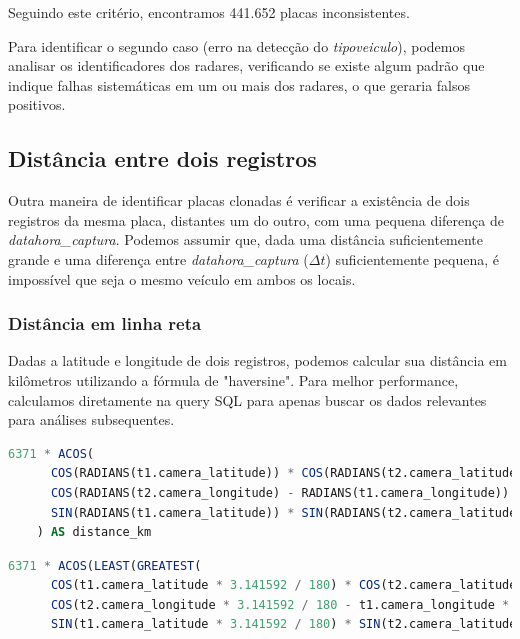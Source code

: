 \documentclass{article}
\begin{document}
Seguindo este critério, encontramos 441.652 placas inconsistentes.

Para identificar o segundo caso (erro na detecção do \textit{tipoveiculo}), podemos analisar os identificadores dos radares, verificando se existe algum padrão que indique falhas sistemáticas em um ou mais dos radares, o que geraria falsos positivos.




\subsection{Distância entre dois registros}

Outra maneira de identificar placas clonadas é verificar a existência de dois registros da mesma placa, distantes um do outro, com uma pequena diferença de \textit{datahora\_captura}. Podemos assumir que, dada uma distância suficientemente grande e uma diferença entre \textit{datahora\_captura} ($\Delta t$) suficientemente pequena, é impossível que seja o mesmo veículo em ambos os locais.

\subsubsection{Distância em linha reta}

Dadas a latitude e longitude de dois registros, podemos calcular sua distância em kilômetros utilizando a fórmula de "haversine". Para melhor performance, calculamos diretamente na query SQL para apenas buscar os dados relevantes para análises subsequentes.

\begin{lstlisting}[language=SQL,caption={Fórmula de haversine para calcular distâncias em kilometros na superfície da Terra, através de latitudes e longitudes.},label={lst:sqlquery6}]
 6371 * ACOS(
      COS(RADIANS(t1.camera_latitude)) * COS(RADIANS(t2.camera_latitude)) *
      COS(RADIANS(t2.camera_longitude) - RADIANS(t1.camera_longitude)) +
      SIN(RADIANS(t1.camera_latitude)) * SIN(RADIANS(t2.camera_latitude))
    ) AS distance_km
\end{lstlisting}

\begin{lstlisting}[language=SQL,caption={Fórmula de haversine para calcular distâncias em kilometros na superfície da Terra, através de latitudes e longitudes. Sem acesso à função RADIANS() nem PI() e resolvendo erro de float point precision na função ACOS().},label={lst:sqlquery7}]
6371 * ACOS(LEAST(GREATEST(
      COS(t1.camera_latitude * 3.141592 / 180) * COS(t2.camera_latitude * 3.141592 / 180) * 
      COS(t2.camera_longitude * 3.141592 / 180 - t1.camera_longitude * 3.141592 / 180) + 
      SIN(t1.camera_latitude * 3.141592 / 180) * SIN(t2.camera_latitude * 3.141592 / 180),-1),1)) AS distance_km
\end{lstlisting}
\end{document}
